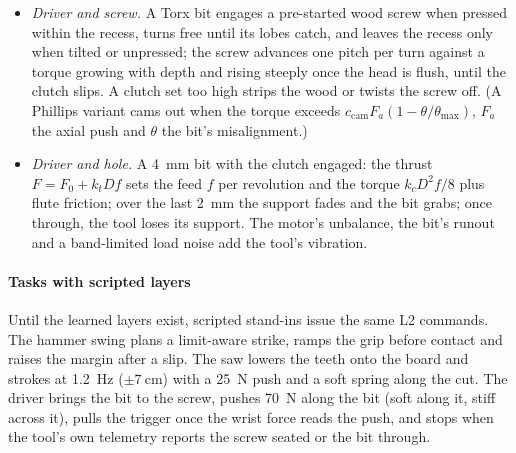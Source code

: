 \begin{itemize}
  \item \emph{Driver and screw.} A Torx bit engages a pre-started wood screw when pressed within the recess, turns
    free until its lobes catch, and leaves the recess only when tilted or unpressed; the screw advances one pitch per
    turn against a torque growing with depth and rising steeply once the head is flush, until the clutch slips. A
    clutch set too high strips the wood or twists the screw off. (A Phillips variant cams out when the torque exceeds
    $c_{\mathrm{cam}}F_a(1-\theta/\theta_{\max})$, $F_a$ the axial push and $\theta$ the bit's misalignment.)
  \item \emph{Driver and hole.} A \SI{4}{\milli\metre} bit with the clutch engaged: the thrust
    $F = F_0 + k_t D f$ sets the feed $f$ per revolution and the torque $k_c D^2 f/8$ plus flute friction; over the
    last \SI{2}{\milli\metre} the support fades and the bit grabs; once through, the tool loses its support. The
    motor's unbalance, the bit's runout and a band-limited load noise add the tool's vibration.
\end{itemize}

\paragraph{Tasks with scripted layers} Until the learned layers exist, scripted stand-ins issue the same L2 commands.
The hammer swing plans a limit-aware strike, ramps the grip before contact and raises the margin after a slip. The
saw lowers the teeth onto the board and strokes at \SI{1.2}{\hertz} ($\pm\SI{7}{\centi\metre}$) with a
\SI{25}{\newton} push and a soft spring along the cut. The driver brings the bit to the screw, pushes
\SI{70}{\newton} along the bit (soft along it, stiff across it), pulls the trigger once the wrist force reads the
push, and stops when the tool's own telemetry reports the screw seated or the bit through.

